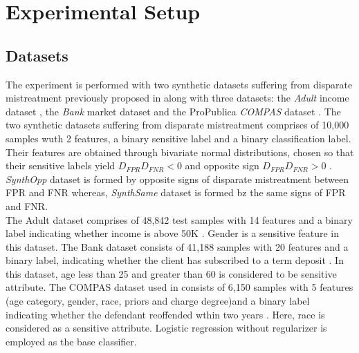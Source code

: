 \documentclass[runningheads]{llncs}
\begin{document}
\section{Experimental Setup}
\subsection{Datasets}
The experiment is performed with two synthetic datasets suffering from disparate mistreatment previously proposed in \cite{zafar2017fairness} along with three datasets: the \textit{Adult} income dataset \cite{kohavi1996scaling}, the \textit{Bank} market dataset \cite{moro2011using} and the ProPublica \textit{COMPAS} dataset \cite{compasdataset}. The two synthetic datasets suffering from disparate mistreatment comprises of 10,000 samples wuth 2 features, a binary sensitive label and a binary classification label. Their features are obtained through bivariate normal distributions, chosen so that their sensitive labels yield $D_{FPR}D_{FNR} < 0$ and opposite sign $D_{FPR}D_{FNR} > 0$ \cite{krasanakis2018adaptive}. \textit{SynthOpp} dataset is formed by opposite signs of disparate mistreatment between FPR and FNR whereas, \textit{SynthSame} dataset is formed bz the same signs of FPR and FNR.\\
The Adult dataset comprises of 48,842 test samples with 14 features and a binary label indicating whether income is above 50K \cite{krasanakis2018adaptive}. Gender is a sensitive feature in this dataset. The Bank dataset consists of 41,188 samples with 20 features and a binary label, indicating whether the client has subscribed to a term deposit \cite{krasanakis2018adaptive}. In this dataset, age less than 25 and greater than 60 is considered to be sensitive attribute. The COMPAS dataset used in \cite{zafar2015fairness} consists of 6,150 samples with 5 features (age category, gender, race, priors and charge degree)and a binary label indicating whether the defendant reoffended wthin two years \cite{krasanakis2018adaptive}. Here, race is considered as a sensitive attribute. Logistic regression without regularizer is employed as the base classifier.
\end{document}
